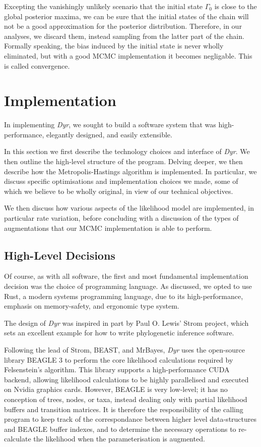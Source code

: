 \documentclass[10pt,journal,compsoc]{IEEEtran}
\begin{document}
Excepting the vanishingly unlikely scenario that the initial state $\Gamma_0$ is close to the global posterior maxima, we can be sure that the initial states of the chain will not be a good approximation for the posterior distribution. Therefore, in our analyses, we discard them, instead sampling from the latter part of the chain. Formally speaking, the bias induced by the initial state is never wholly eliminated, but with a good MCMC implementation it becomes negligable. This is called convergence.

\section{Implementation}\label{sec:implementation}

In implementing \textit{Dyr}, we sought to build a software system that was high-performance, elegantly designed, and easily extensible.

In this section we first describe the technology choices and interface of \textit{Dyr}. We then outline the high-level structure of the program. Delving deeper, we then describe how the Metropolis-Hastings algorithm is implemented. In particular, we discuss specific optimisations and implementation choices we made, some of which we believe to be wholly original, in view of our technical objectives.

We then discuss how various aspects of the likelihood model are implemented, in particular rate variation, before concluding with a discussion of the types of augmentations that our MCMC implementation is able to perform.

\subsection{High-Level Decisions}

Of course, as with all software, the first and most fundamental implementation decision was the choice of programming language. As discussed, we opted to use Rust, a modern systems programming language, due to its high-performance, emphasis on memory-safety, and ergonomic type system.

The design of \textit{Dyr} was inspired in part by Paul O. Lewis' Strom project, which sets an excellent example for how to write phylogenetic inference software.

Following the lead of Strom, BEAST, and MrBayes, \textit{Dyr} uses the open-source library BEAGLE 3 to perform the core likelihood calculations required by Felsenstein's algorithm. This library supports a high-performance CUDA backend, allowing likelihood calculations to be highly parallelised and executed on Nvidia graphics cards. However, BEAGLE is very low-level; it has no conception of trees, nodes, or taxa, instead dealing only with partial likelihood buffers and transition matrices. It is therefore the responsibility of the calling program to keep track of the correspondance between higher level data-structures and BEAGLE buffer indexes, and to determine the necessary operations to re-calculate the likelihood when the parameterisation is augmented.
\end{document}
